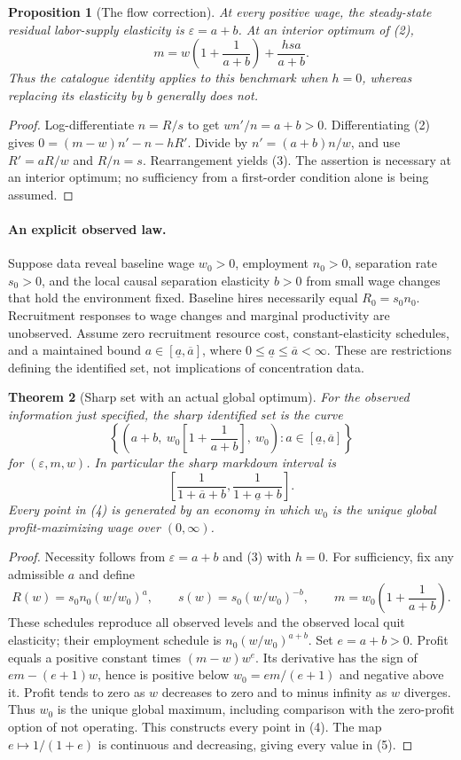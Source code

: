 \documentclass[11pt]{article}
\newtheorem{theorem}{Theorem}
\newtheorem{proposition}[theorem]{Proposition}
\theoremstyle{definition}
\begin{document}
\begin{proposition}[The flow correction]
At every positive wage, the steady-state residual labor-supply elasticity is $\varepsilon=a+b$. At an interior optimum of (2),
\[
 m=w\left(1+\frac{1}{a+b}\right)
       +\frac{hsa}{a+b}.
 \tag{3}
\]
Thus the catalogue identity applies to this benchmark when $h=0$, whereas replacing its elasticity by $b$ generally does not.
\end{proposition}
\begin{proof}
Log-differentiate $n=R/s$ to get $wn'/n=a+b>0$. Differentiating (2) gives $0=(m-w)n'-n-hR'$. Divide by $n'=(a+b)n/w$, and use $R'=aR/w$ and $R/n=s$. Rearrangement yields (3). The assertion is necessary at an interior optimum; no sufficiency from a first-order condition alone is being assumed.
\end{proof}

\paragraph{An explicit observed law.}
Suppose data reveal baseline wage $w_0>0$, employment $n_0>0$, separation rate $s_0>0$, and the local causal separation elasticity $b>0$ from small wage changes that hold the environment fixed. Baseline hires necessarily equal $R_0=s_0n_0$. Recruitment responses to wage changes and marginal productivity are unobserved. Assume zero recruitment resource cost, constant-elasticity schedules, and a maintained bound $a\in[\underline a,\overline a]$, where $0\leq\underline a\leq\overline a<\infty$. These are restrictions defining the identified set, not implications of concentration data.

\begin{theorem}[Sharp set with an actual global optimum]
For the observed information just specified, the sharp identified set is the curve
\[
 \left\{\left(a+b,\ w_0\left[1+\frac{1}{a+b}\right],\ w_0\right):
      a\in[\underline a,\overline a]\right\}
 \tag{4}
\]
for $(\varepsilon,m,w)$. In particular the sharp markdown interval is
\[
 \left[\frac{1}{1+\overline a+b},\frac{1}{1+\underline a+b}\right].
 \tag{5}
\]
Every point in (4) is generated by an economy in which $w_0$ is the unique global profit-maximizing wage over $(0,\infty)$.
\end{theorem}
\begin{proof}
Necessity follows from $\varepsilon=a+b$ and (3) with $h=0$. For sufficiency, fix any admissible $a$ and define
\[
 R(w)=s_0n_0(w/w_0)^a,\qquad
 s(w)=s_0(w/w_0)^{-b},\qquad
 m=w_0\left(1+\frac{1}{a+b}\right).
\]
These schedules reproduce all observed levels and the observed local quit elasticity; their employment schedule is $n_0(w/w_0)^{a+b}$. Set $e=a+b>0$. Profit equals a positive constant times $(m-w)w^e$. Its derivative has the sign of $em-(e+1)w$, hence is positive below $w_0=em/(e+1)$ and negative above it. Profit tends to zero as $w$ decreases to zero and to minus infinity as $w$ diverges. Thus $w_0$ is the unique global maximum, including comparison with the zero-profit option of not operating. This constructs every point in (4). The map $e\mapsto1/(1+e)$ is continuous and decreasing, giving every value in (5).
\end{proof}
\end{document}
